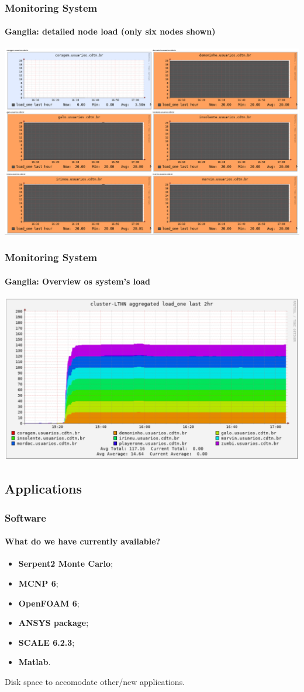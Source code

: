 \documentclass[svgnames,smaller,table]{beamer}
\begin{document}
\begin{frame}
  \frametitle{Monitoring System}
  \framesubtitle{Ganglia: detailed node load (\textbf{only six nodes shown})}
  \centering\includegraphics[scale=0.36]{images/ganglia_nodes.png}
\end{frame}


\begin{frame}
  \frametitle{Monitoring System}
  \framesubtitle{Ganglia: Overview os system's load}
  \centering\includegraphics[scale=0.40]{images/ganglia_rainbow.png}
\end{frame}


\subsection{Applications}
\begin{frame}
  \frametitle{Software}
  \framesubtitle{What do we have currently available?}
  \begin{itemize}
  \item \textbf{Serpent2 Monte Carlo};
  \item \textbf{MCNP 6};
  \item \textbf{OpenFOAM 6};
  \item \textbf{ANSYS package};
  \item \textbf{SCALE 6.2.3};
  \item \textbf{Matlab}.
  \end{itemize}
  \vspace{10px}
  Disk space to accomodate other/new applications. 
\end{frame}
\end{document}
